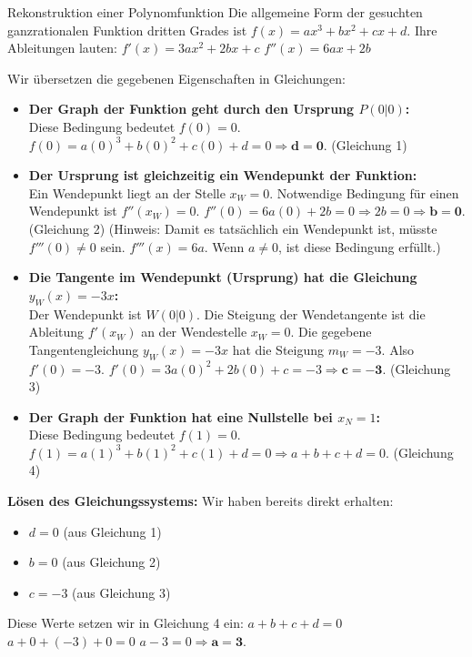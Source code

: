 \begin{loesungsumgebung}{Rekonstruktion einer Polynomfunktion}
Die allgemeine Form der gesuchten ganzrationalen Funktion dritten Grades ist $f(x) = ax^3 + bx^2 + cx + d$.
Ihre Ableitungen lauten:
$f'(x) = 3ax^2 + 2bx + c$
$f''(x) = 6ax + 2b$

Wir übersetzen die gegebenen Eigenschaften in Gleichungen:

\begin{itemize}
    \item \textbf{Der Graph der Funktion geht durch den Ursprung $P(0|0)$:} \\
    Diese Bedingung bedeutet $f(0)=0$.
    $f(0) = a(0)^3 + b(0)^2 + c(0) + d = 0 \Rightarrow \mathbf{d=0}$. (Gleichung 1)

    \item \textbf{Der Ursprung ist gleichzeitig ein Wendepunkt der Funktion:} \\
    Ein Wendepunkt liegt an der Stelle $x_W=0$. Notwendige Bedingung für einen Wendepunkt ist $f''(x_W)=0$.
    $f''(0) = 6a(0) + 2b = 0 \Rightarrow 2b=0 \Rightarrow \mathbf{b=0}$. (Gleichung 2)
    (Hinweis: Damit es tatsächlich ein Wendepunkt ist, müsste $f'''(0) \neq 0$ sein. $f'''(x)=6a$. Wenn $a \neq 0$, ist diese Bedingung erfüllt.)

    \item \textbf{Die Tangente im Wendepunkt (Ursprung) hat die Gleichung $y_W(x) = -3x$:} \\
    Der Wendepunkt ist $W(0|0)$. Die Steigung der Wendetangente ist die Ableitung $f'(x_W)$ an der Wendestelle $x_W=0$. Die gegebene Tangentengleichung $y_W(x)=-3x$ hat die Steigung $m_W=-3$.
    Also $f'(0) = -3$.
    $f'(0) = 3a(0)^2 + 2b(0) + c = -3 \Rightarrow \mathbf{c=-3}$. (Gleichung 3)

    \item \textbf{Der Graph der Funktion hat eine Nullstelle bei $x_N = 1$:} \\
    Diese Bedingung bedeutet $f(1)=0$.
    $f(1) = a(1)^3 + b(1)^2 + c(1) + d = 0 \Rightarrow a+b+c+d=0$. (Gleichung 4)
\end{itemize}

\textbf{Lösen des Gleichungssystems:}
Wir haben bereits direkt erhalten:
\begin{itemize}
    \item $d=0$ (aus Gleichung 1)
    \item $b=0$ (aus Gleichung 2)
    \item $c=-3$ (aus Gleichung 3)
\end{itemize}
Diese Werte setzen wir in Gleichung 4 ein:
$a + b + c + d = 0$
$a + 0 + (-3) + 0 = 0$
$a - 3 = 0 \Rightarrow \mathbf{a=3}$.


\end{loesungsumgebung}
